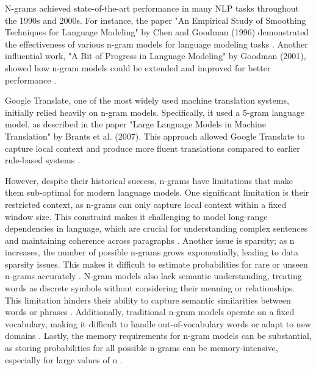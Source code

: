 \documentclass[a4paper, oneside]{discothesis}
\begin{document}
N-grams achieved state-of-the-art performance in many NLP tasks throughout the 1990s and 2000s. For instance, the paper "An Empirical Study of Smoothing Techniques for Language Modeling" by Chen and Goodman (1996) demonstrated the effectiveness of various n-gram models for language modeling tasks \cite{chen1996empirical}. Another influential work, "A Bit of Progress in Language Modeling" by Goodman (2001), showed how n-gram models could be extended and improved for better performance \cite{goodman2001bit}.

Google Translate, one of the most widely used machine translation systems, initially relied heavily on n-gram models. Specifically, it used a 5-gram language model, as described in the paper "Large Language Models in Machine Translation" by Brants et al. (2007). This approach allowed Google Translate to capture local context and produce more fluent translations compared to earlier rule-based systems \cite{brants2007large}.

However, despite their historical success, n-grams have limitations that make them sub-optimal for modern language models. One significant limitation is their restricted context, as n-grams can only capture local context within a fixed window size. This constraint makes it challenging to model long-range dependencies in language, which are crucial for understanding complex sentences and maintaining coherence across paragraphs \cite{bengio2003neural}. Another issue is sparsity; as n increases, the number of possible n-grams grows exponentially, leading to data sparsity issues. This makes it difficult to estimate probabilities for rare or unseen n-grams accurately \cite{katz1987estimation}. N-gram models also lack semantic understanding, treating words as discrete symbols without considering their meaning or relationships. This limitation hinders their ability to capture semantic similarities between words or phrases \cite{mikolov2013distributed}. Additionally, traditional n-gram models operate on a fixed vocabulary, making it difficult to handle out-of-vocabulary words or adapt to new domains \cite{jelinek1990self}. Lastly, the memory requirements for n-gram models can be substantial, as storing probabilities for all possible n-grams can be memory-intensive, especially for large values of n \cite{heafield2011kenlm}.
\end{document}
